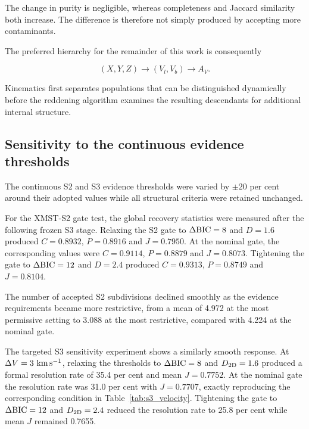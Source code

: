 \documentclass[fleqn,usenatbib]{rasti}
\begin{document}
The change in purity is negligible, whereas completeness and Jaccard
similarity both increase. The difference is therefore not simply produced
by accepting more contaminants.

The preferred hierarchy for the remainder of this work is consequently

\[
(X,Y,Z)\rightarrow(V_l,V_b)\rightarrow A_V.
\]

Kinematics first separates populations that can be distinguished
dynamically before the reddening algorithm examines the resulting
descendants for additional internal structure.


\FloatBarrier

\subsection{Sensitivity to the continuous evidence thresholds}
\label{sec:gate_results}

The continuous S2 and S3 evidence thresholds were varied by
$\pm20$ per cent around their adopted values while all structural criteria
were retained unchanged.

For the XMST-S2 gate test, the global recovery statistics were measured
after the following frozen S3 stage. Relaxing the S2 gate to
$\Delta{\rm BIC}=8$ and $D=1.6$ produced
$C=0.8932$, $P=0.8916$ and $J=0.7950$.
At the nominal gate, the corresponding values were
$C=0.9114$, $P=0.8879$ and $J=0.8073$.
Tightening the gate to
$\Delta{\rm BIC}=12$ and $D=2.4$ produced
$C=0.9313$, $P=0.8749$ and $J=0.8104$.

The number of accepted S2 subdivisions declined smoothly as the evidence
requirements became more restrictive, from a mean of 4.972 at the most
permissive setting to 3.088 at the most restrictive, compared with 4.224
at the nominal gate.

The targeted S3 sensitivity experiment shows a similarly smooth response.
At $\Delta V=3~{\rm km\,s^{-1}}$, relaxing the thresholds to
$\Delta{\rm BIC}=8$ and $D_{\rm 2D}=1.6$ produced a formal resolution
rate of 35.4 per cent and mean $J=0.7752$. At the nominal gate the
resolution rate was 31.0 per cent with $J=0.7707$, exactly reproducing the
corresponding condition in Table~\ref{tab:s3_velocity}. Tightening the gate
to $\Delta{\rm BIC}=12$ and $D_{\rm 2D}=2.4$ reduced the resolution rate
to 25.8 per cent while mean $J$ remained 0.7655.
\end{document}
